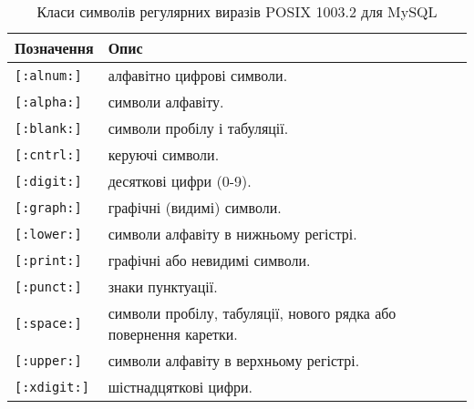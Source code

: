 \begin{longtable}[t]{|l|p{20em}|}

\caption{Класи символів регулярних виразів POSIX 1003.2 для MySQL} \label{chr3-rxp:table}\\
\hline

Позначення & Опис \\
\hline


\verb|[:alnum:]| & алфавітно цифрові символи. \\
\verb|[:alpha:]| & символи алфавіту. \\
\verb|[:blank:]| & символи пробілу і табуляції. \\
\verb|[:cntrl:]| & керуючі символи. \\
\verb|[:digit:]| & десяткові цифри (0-9). \\
\verb|[:graph:]| & графічні (видимі) символи. \\
\verb|[:lower:]| & символи алфавіту в нижньому регістрі. \\
\verb|[:print:]| & графічні або невидимі символи. \\
\verb|[:punct:]| & знаки пунктуації. \\
\verb|[:space:]| & символи пробілу, табуляції, нового рядка або повернення каретки. \\
\verb|[:upper:]| & символи алфавіту в верхньому регістрі. \\
\verb|[:xdigit:]| & шістнадцяткові цифри. \\

\hline
\end{longtable}


\pagebreak[3]



